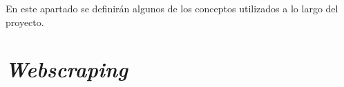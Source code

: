 
En este apartado se definirán algunos de los conceptos utilizados a lo largo del proyecto.


\section{\textit{Webscraping}}
